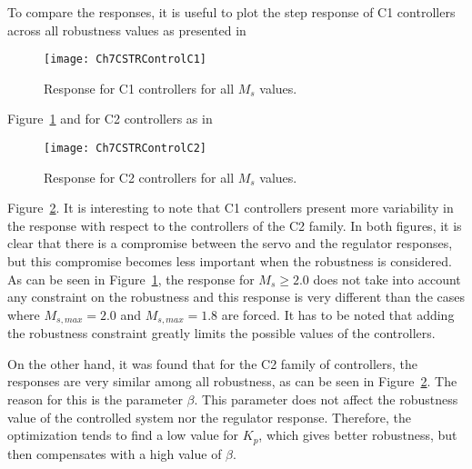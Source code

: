 To compare the responses, it is useful to plot the step response of C1 controllers across all robustness values as presented in %
\begin{figure}[tb]
	\centering
	\texttt{[image: Ch7CSTRControlC1]}
	\caption{Response for C1 controllers for all $M_s$ values.}
	\label{fig:Ch7CSTRControlC1}
\end{figure}
%
Figure~\ref{fig:Ch7CSTRControlC1} and for C2 controllers as in %
\begin{figure}[tb]
	\centering
	\texttt{[image: Ch7CSTRControlC2]}
	\caption{Response for C2 controllers for all $M_s$ values.}
	\label{fig:Ch7CSTRControlC2}
\end{figure}
%
Figure~\ref{fig:Ch7CSTRControlC2}. It is interesting to note that C1 controllers present more variability in the response with respect to the controllers of the C2 family. In both figures, it is clear that there is a compromise between the servo and the regulator responses, but this compromise becomes less important when the robustness is considered. As can be seen in Figure~\ref{fig:Ch7CSTRControlC1}, the response for $M_s \geq 2.0$ does not take into account any constraint on the robustness and this response is very different than the cases where $M_{s,max} = 2.0$ and $M_{s,max} = 1.8$ are forced. It has to be noted that adding the robustness constraint greatly limits the possible values of the controllers.

On the other hand, it was found that for the C2 family of controllers, the responses are very similar among all robustness, as can be seen in Figure~\ref{fig:Ch7CSTRControlC2}. The reason for this is the parameter $\beta$. This parameter does not affect the robustness value of the controlled system nor the regulator response. Therefore, the optimization tends to find a low value for $K_p$, which gives better robustness, but then compensates with a high value of $\beta$.

